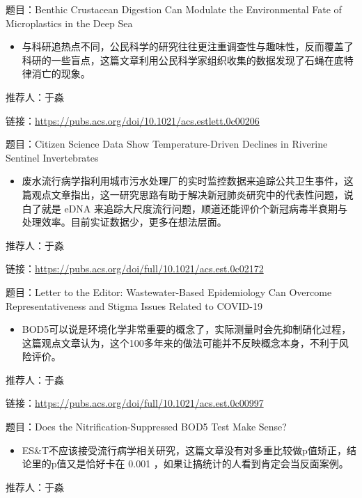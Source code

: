 \documentclass[]{book}
\providecommand{\tightlist}{%
  \setlength{\itemsep}{0pt}\setlength{\parskip}{0pt}}
\begin{document}
题目：Benthic Crustacean Digestion Can Modulate the Environmental Fate of Microplastics in the Deep Sea

\begin{itemize}
\tightlist
\item
  与科研追热点不同，公民科学的研究往往更注重调查性与趣味性，反而覆盖了科研的一些盲点，这篇文章利用公民科学家组织收集的数据发现了石蝇在底特律消亡的现象。
\end{itemize}

推荐人：于淼

链接：\url{https://pubs.acs.org/doi/10.1021/acs.estlett.0c00206}

题目：Citizen Science Data Show Temperature-Driven Declines in Riverine Sentinel Invertebrates

\begin{itemize}
\tightlist
\item
  废水流行病学指利用城市污水处理厂的实时监控数据来追踪公共卫生事件，这篇观点文章指出，这一研究思路有助于解决新冠肺炎研究中的代表性问题，说白了就是 eDNA 来追踪大尺度流行问题，顺道还能评价个新冠病毒半衰期与处理效率。目前实证数据少，更多在想法层面。
\end{itemize}

推荐人：于淼

链接：\url{https://pubs.acs.org/doi/full/10.1021/acs.est.0c02172}

题目：Letter to the Editor: Wastewater-Based Epidemiology Can Overcome Representativeness and Stigma Issues Related to COVID-19

\begin{itemize}
\tightlist
\item
  BOD5可以说是环境化学非常重要的概念了，实际测量时会先抑制硝化过程，这篇观点文章认为，这个100多年来的做法可能并不反映概念本身，不利于风险评价。
\end{itemize}

推荐人：于淼

链接：\url{https://pubs.acs.org/doi/full/10.1021/acs.est.0c00997}

题目：Does the Nitrification-Suppressed BOD5 Test Make Sense?

\begin{itemize}
\tightlist
\item
  ES\&T不应该接受流行病学相关研究，这篇文章没有对多重比较做p值矫正，结论里的p值又是恰好卡在 0.001 ，如果让搞统计的人看到肯定会当反面案例。
\end{itemize}

推荐人：于淼
\end{document}
